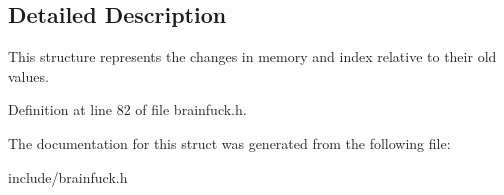 \subsection{Detailed Description}
This structure represents the changes in memory and index relative to their old values. 

Definition at line 82 of file brainfuck.\+h.



The documentation for this struct was generated from the following file\+:\begin{DoxyCompactItemize}
\item 
include/brainfuck.\+h\end{DoxyCompactItemize}
